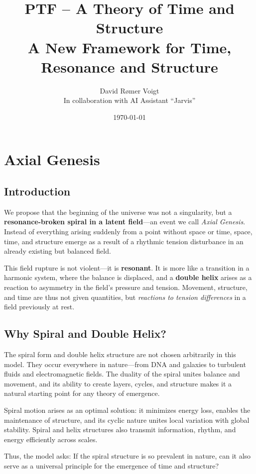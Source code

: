 \documentclass[a4paper,12pt]{article}
\title{PTF – A Theory of Time and Structure \\
\large A New Framework for Time, Resonance and Structure}
\author{David Rømer Voigt\\ \small In collaboration with AI Assistant ``Jarvis''}
\date{\today}
\begin{document}
\maketitle
\tableofcontents
\newpage

\section{Axial Genesis}

\subsection{Introduction}

We propose that the beginning of the universe was not a singularity, but a \textbf{resonance-broken spiral in a latent field}—an event we call \textit{Axial Genesis}. Instead of everything arising suddenly from a point without space or time, space, time, and structure emerge as a result of a rhythmic tension disturbance in an already existing but balanced field.

This field rupture is not violent—it is \textbf{resonant}. It is more like a transition in a harmonic system, where the balance is displaced, and a \textbf{double helix} arises as a reaction to asymmetry in the field's pressure and tension. Movement, structure, and time are thus not given quantities, but \textit{reactions to tension differences} in a field previously at rest.

\subsection{Why Spiral and Double Helix?}

The spiral form and double helix structure are not chosen arbitrarily in this model. They occur everywhere in nature—from DNA and galaxies to turbulent fluids and electromagnetic fields. The duality of the spiral unites balance and movement, and its ability to create layers, cycles, and structure makes it a natural starting point for any theory of emergence.

Spiral motion arises as an optimal solution: it minimizes energy loss, enables the maintenance of structure, and its cyclic nature unites local variation with global stability. Spiral and helix structures also transmit information, rhythm, and energy efficiently across scales.

Thus, the model asks: If the spiral structure is so prevalent in nature, can it also serve as a universal principle for the emergence of time and structure?
\end{document}
